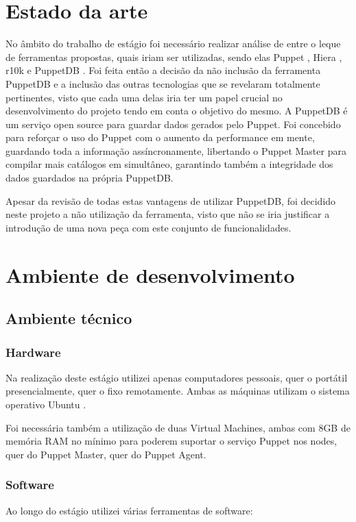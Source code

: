 \documentclass{article}
\begin{document}
\cleardoublepage
\section{Estado da arte}
No âmbito do trabalho de estágio foi necessário realizar análise de entre o leque de ferramentas propostas, quais iriam ser utilizadas, sendo elas Puppet \cite{puppet}, Hiera \cite{hiera}, r10k \cite{r10k} e PuppetDB \cite{puppetdb}. Foi feita então a decisão da não inclusão da ferramenta PuppetDB \cite{puppetdb} e a inclusão das outras tecnologias que se revelaram totalmente pertinentes, visto que cada uma delas iria ter um papel crucial no desenvolvimento do projeto tendo em conta o objetivo do mesmo. A PuppetDB é um serviço open source \cite{opensource} para guardar dados gerados pelo Puppet. Foi concebido para reforçar o uso do Puppet com o aumento da performance em mente, guardando toda a informação assíncronamente, libertando o Puppet Master \cite{puppet-master} para compilar mais catálogos em simultâneo, garantindo também a integridade dos dados guardados na própria PuppetDB.

Apesar da revisão de todas estas vantagens de utilizar PuppetDB, foi decidido neste projeto a não utilização da ferramenta, visto que não se iria justificar a introdução de uma nova peça com este conjunto de funcionalidades.
\cleardoublepage
\section{Ambiente de desenvolvimento}

\subsection{Ambiente técnico}
\subsubsection{Hardware}

Na realização deste estágio utilizei apenas computadores pessoais, quer o portátil presencialmente, quer o fixo remotamente. Ambas as máquinas utilizam o sistema operativo Ubuntu \cite{ubuntu}.

Foi necessária também a utilização de duas Virtual Machines, ambas com 8GB de memória RAM no mínimo para poderem suportar o serviço Puppet\cite{puppet} nos nodes, quer do Puppet Master\cite{puppet-master}, quer do Puppet Agent\cite{puppet-agent}.


\subsubsection{Software}
Ao longo do estágio utilizei várias ferramentas de software:
\end{document}
